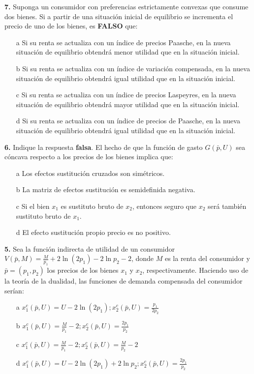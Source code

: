 \documentclass{nuevotema}
\begin{document}
\textbf{7.} Suponga un consumidor con preferencias estrictamente convexas que consume dos bienes. Si a partir de una situación inicial de equilibrio se incrementa el precio de uno de los bienes, es \textbf{FALSO} que:
\begin{enumerate}
	\item[a] Si su renta se actualiza con un índice de precios Paasche, en la nueva situación de equilibrio obtendrá menor utilidad que en la situación inicial.
	\item[b] Si su renta se actualiza con un índice de variación compensada, en la nueva situación de equilibrio obtendrá igual utilidad que en la situación inicial.
	\item[c] Si su renta se actualiza con un índice de precios Laspeyres, en la nueva situación de equilibrio obtendrá mayor utilidad que en la situación inicial.
	\item[d] Si su renta se actualiza con un índice de precios de Paasche, en la nueva situación de equilibrio obtendrá igual utilidad que en la situación inicial.
\end{enumerate}

\textbf{6.} Indique la respuesta \textbf{falsa}. El hecho de que la función de gasto $G(\bar{p}, U)$ sea cóncava respecto a los precios de los bienes implica que:
\begin{enumerate}
	\item[a] Los efectos sustitución cruzados son simétricos.
	\item[b] La matriz de efectos sustitución es semidefinida negativa.
	\item[c] Si el bien $x_1$ es sustituto bruto de $x_2$, entonces seguro que $x_2$ será también sustituto bruto de $x_1$.
	\item[d] El efecto sustitución propio precio es no positivo.
\end{enumerate}

\textbf{5.} Sea la función indirecta de utilidad de un consumidor $V(\bar{p}, M) = \frac{M}{p_1} + 2 \ln (2p_1) - 2 \ln p_2 - 2$, donde $M$ es la renta del consumidor y $\bar{p} = (p_1, p_2)$ los precios de los bienes $x_1$ y $x_2$, respectivamente. Haciendo uso de la teoría de la dualidad, las funciones de demanda compensada del consumidor serían:

\begin{enumerate}
	\item[a] $x_1^c (\bar{p}, U) = U -2 \ln (2p_1); x_2^c(\bar{p}, U) = \frac{p_1}{2p_2}$
	\item[b] $x_1^c (\bar{p}, U) = \frac{M}{p_1} - 2 ; x_2^c(\bar{p}, U) = \frac{2p_1}{p_2} $
	\item[c] $x_1^c (\bar{p}, U) = \frac{M}{p_1} - 2 ; x_2^c(\bar{p}, U) = \frac{M}{p_2} - 2 $
	\item[d] $x_1^c (\bar{p}, U) = U - 2 \ln (2p_1) + 2 \ln p_2 ; x_2^c(\bar{p}, U) = \frac{2p_1}{p_2} $
\end{enumerate}
\end{document}
